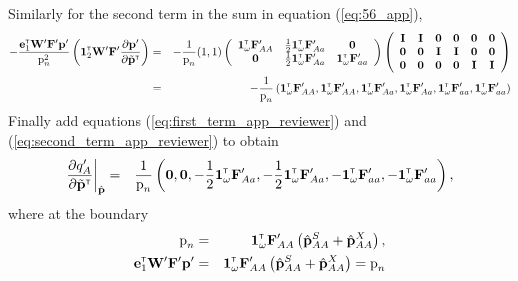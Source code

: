 \documentclass[11pt]{article}
\newcommand{\bo}[1]{{\bf #1}}
\newcommand{\tr}{{\mbox{\tiny \sf T}}}
\begin{document}
Similarly for the second term in the sum in equation (\ref{eq:56_app}),
\begin{eqnarray}
	- \frac{\mathbf{e}_1^\tr \mathbf{W}^\prime \mathbf{F}^\prime \mathbf{p}^\prime}{ \mbox{p}_{n}^2} \left( \mathbf{1}^\tr_{2}\mathbf{W}^\prime\mathbf{F}^\prime \frac{\partial  \mathbf{p}^\prime}{\partial \tilde{\bo p}^\tr} \right) &=& -\frac{1}{ \mbox{p}_{n}}(1,1) \left(\begin{array} {ccc}
\mathbf{1}^\tr_{\omega} \mathbf{F}_{AA}^\prime& \frac{1}{2}\mathbf{1}^\tr_{\omega} \mathbf{F}_{Aa}^\prime &\mathbf{0} \\
\mathbf{0} &\frac{1}{2}\mathbf{1}^\tr_{\omega} \mathbf{F}_{Aa}^\prime & \mathbf{1}^\tr_{\omega} \mathbf{F}_{aa}^\prime
\end{array}\right) \left(\begin{array} {cccccc}
\mathbf{I}& \mathbf{I}& \mathbf{0}  &\mathbf{0} &\mathbf{0}  &\mathbf{0} \\
\mathbf{0} &\mathbf{0}  &\mathbf{I}& \mathbf{I}& \mathbf{0} &\mathbf{0} \\
\mathbf{0} &\mathbf{0}  &\mathbf{0} &\mathbf{0}  &  \mathbf{I}& \mathbf{I}
\end{array}\right) \nonumber \\
 &=& -\frac{1}{ \mbox{p}_{n}} \left( \mathbf{1}^\tr_{\omega} \mathbf{F}_{AA}^\prime, \mathbf{1}^\tr_{\omega} \mathbf{F}_{AA}^\prime , \mathbf{1}^\tr_{\omega} \mathbf{F}_{Aa}^\prime, \mathbf{1}^\tr_{\omega} \mathbf{F}_{Aa}^\prime, \mathbf{1}^\tr_{\omega} \mathbf{F}_{aa}^\prime , \mathbf{1}^\tr_{\omega} \mathbf{F}_{aa}^\prime  \right) \label{eq:second_term_app_reviewer}
\end{eqnarray}
Finally add equations (\ref{eq:first_term_app_reviewer}) and (\ref{eq:second_term_app_reviewer}) to obtain
\begin{eqnarray}
  \frac{\partial   q^\prime_A }{\partial \tilde{\bo p}^\tr}\bigg\rvert_{\hat{\bo p}}&=& \frac{1}{ \mbox{p}_{n}} \left( \mathbf{0}, \mathbf{0}, -\frac{1}{2}\mathbf{1}^\tr_{\omega} \mathbf{F}_{Aa}^\prime, -\frac{1}{2}\mathbf{1}^\tr_{\omega} \mathbf{F}_{Aa}^\prime, -\mathbf{1}^\tr_{\omega} \mathbf{F}_{aa}^\prime, -\mathbf{1}^\tr_{\omega} \mathbf{F}_{aa}^\prime  \right) \label{eq:79_app},
\end{eqnarray}
where at the boundary
\begin{eqnarray}
  \mbox{p}_{n}&=&\mathbf{1}^\tr_\omega \mathbf{F}_{AA}^\prime \left( \hat{\mathbf{p}}^S_{AA}+\hat{\mathbf{p}}^X_{AA} \right), \\
  \mathbf{e}_1^\tr \mathbf{W}^\prime \mathbf{F}^\prime \mathbf{p}^\prime&=&\mathbf{1}^\tr_\omega \mathbf{F}_{AA}^\prime \left( \hat{\mathbf{p}}^S_{AA}+\hat{\mathbf{p}}^X_{AA} \right)=  \mbox{p}_{n}
\end{eqnarray}
\end{document}
